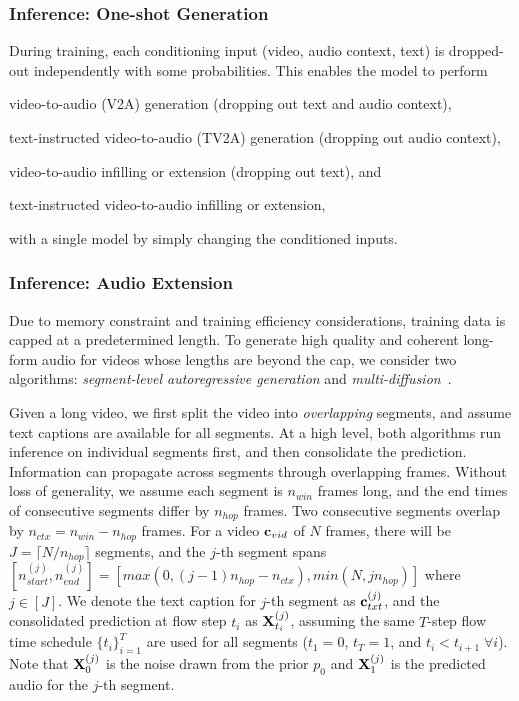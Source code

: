 
\subsubsection{Inference: One-shot Generation}
During training, each conditioning input (video, audio context, text) is dropped-out independently with some probabilities.
This enables the model to perform
\begin{enumerate*}[label=(\arabic*)]
    \item video-to-audio (V2A) generation (dropping out text and audio context),
    \item text-instructed video-to-audio (TV2A) generation (dropping out audio context),
    \item video-to-audio infilling or extension (dropping out text), and
    \item text-instructed video-to-audio infilling or extension,
\end{enumerate*}
with a single model by simply changing the conditioned inputs.

\subsubsection{Inference: Audio Extension}\label{sec:audio_ext}
Due to memory constraint and training efficiency considerations, training data is capped at a predetermined length.
To generate high quality and coherent long-form audio for videos whose lengths are beyond the cap,
we consider two algorithms: \textit{segment-level autoregressive generation} and \textit{multi-diffusion}~\citep{bar2023multidiffusion}.

Given a long video, we first split the video into \textit{overlapping} segments, and assume text captions are available for all segments.
At a high level, both algorithms run inference on individual segments first, and then consolidate the prediction.
Information can propagate across segments through overlapping frames.
Without loss of generality, we assume each segment is $n_{win}$ frames long,
and the end times of consecutive segments differ by $n_{hop}$ frames.
Two consecutive segments overlap by $n_{ctx} = n_{win} - n_{hop}$ frames.
For a video $\mathbf{c}_{vid}$ of $N$ frames,
there will be $J = \lceil N / n_{hop} \rceil$ segments,
and the $j$-th segment spans $[n_{start}^{(j)}, n_{end}^{(j)}] = [max(0, (j-1)n_{hop} - n_{ctx}), min(N, jn_{hop})]$ where $j \in [J]$.
We denote the text caption for $j$-th segment as $\mathbf{c}_{txt}^{(j)}$,
and the consolidated prediction at flow step $t_i$ as $\mathbf{X}_{t_i}^{(j)}$,
assuming the same $T$-step flow time schedule $\{t_i\}_{i=1}^T$ are used for all segments ($t_1 = 0$, $t_T = 1$, and $t_i < t_{i+1}\;\forall i$).
Note that $\mathbf{X}_0^{(j)}$ is the noise drawn from the prior $p_0$ and $\mathbf{X}_1^{(j)}$ is the predicted audio for the $j$-th segment.


